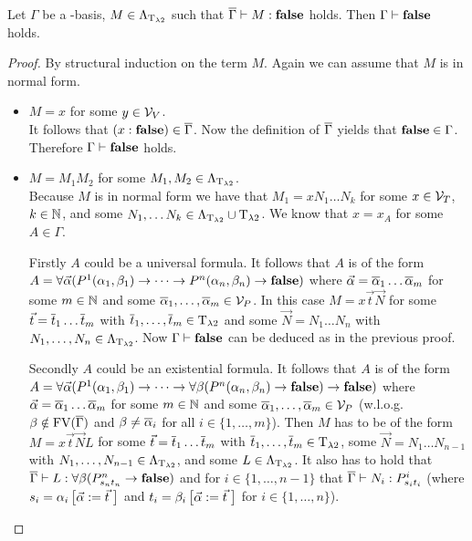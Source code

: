 \begin{lemma}\label{l2}
Let $\Gamma$ be a \SysP-basis, $M\in\Lambda_{\text{T}_{\lambda2}}$ such that $\overline{\Gamma}\vdash M:\textbf{false}$ holds. Then $\Gamma\vdash\textbf{false}$ holds.
\end{lemma}
\begin{proof}
By structural induction on the term $M$.
Again we can assume that $M$ is in normal form.
\begin{itemize}
	\item[] \underline{$M=x$} for some $y\in\mathcal{V}_V$.\\
		It follows that $(x:\textbf{false})\in\overline{\Gamma}$. Now the definition of $\overline{\Gamma}$ yields that $\textbf{false}\in\Gamma$. Therefore $\Gamma\vdash \textbf{false}$ holds.
	\item[] \underline{$M=M_1M_2$} for some $M_1,M_2\in\Lambda_{\text{T}_{\lambda2}}$.\\
		Because $M$ is in normal form we have that $M_1=xN_1\dots N_k$ for some $x\in\mathcal{V}_T$, $k\in\mathbb{N}$, and some $N_1,\dots N_k\in\Lambda_{\text{T}_{\lambda2}}\cup\text{T}_{\lambda2}$.
		We know that $x=x_A$ for some $A\in\Gamma$.
		
		Firstly $A$ could be a universal formula. It follows that $A$ is of the form $A=\forall\predVec(P^1(\predFst[1],\predSnd[1])\to\dots\to P^n(\predFst[n],\predSnd[n])\to\false)$ where $\predVec=\predVec[1]\dots\predVec[m]$ for some $m\in\mathbb{N}$ and some $\predVec[1],\dots,\predVec[m]\in\VarP$. In this case $M=x\vec{t}\vec{N}$ for some $\predTVec=\predTVec[1]\dots \predTVec[m]$ with $\predTVec[1],\dots,\predTVec[m]\in\lambdaTypes$ and some $\vec{N}=N_1\dots N_n$ with $N_1,\dots,N_n\in\Lambda_{\text{T}_{\lambda2}}$. Now $\Gamma\vdash\textbf{false}$ can be deduced as in the previous proof.
		
		Secondly $A$ could be an existential formula. It follows that $A$ is of the form $A=\forall\predVec(P^1(\predFst[1],\predSnd[1])\to\dots\to \forall\beta(P^n(\predFst[n],\predSnd[n])\to\false)\to \false)$ where $\predVec=\predVec[1]\dots\predVec[m]$ for some $m\in\mathbb{N}$ and some $\predVec[1],\dots,\predVec[m]\in\VarP$ (w.l.o.g. $\beta\notin\text{FV}(\overline{\Gamma})$ and $\beta\neq\predVec[i]$ for all $i\in\{1,\dots,m\}$).
		Then $M$ has to be of the form $M=x\vec{t}\vec{N}L$ for some $\predTVec=\predTVec[1]\dots \predTVec[m]$ with $\predTVec[1],\dots,\predTVec[m]\in\lambdaTypes$, some $\vec{N}=N_1\dots N_{n-1}$ with $N_1,\dots,N_{n-1}\in\Lambda_{\text{T}_{\lambda2}}$, and some $L\in\Lambda_{\text{T}_{\lambda2}}$. It also has to hold that $\trans{\Gamma}\lambdaModels L:\forall\beta(\code{P^n}{\predTFst[n]}{\predTSnd[n]}\to\false)$ and for $i\in\{1,\dots,n-1\}$ that $\trans{\Gamma}\lambdaModels N_i:\code{P^i}{\predTFst[i]}{\predTSnd[i]}$ (where $\predTFst[i]=\predFst[i]\left[\predVec:=\predTVec\hspace{1mm}\right]$ and  $\predTSnd[i]=\predSnd[i]\left[\predVec:=\predTVec\hspace{1mm}\right]$ for $i\in\{1,\dots,n\}$).
		

\end{itemize}
\end{proof}

